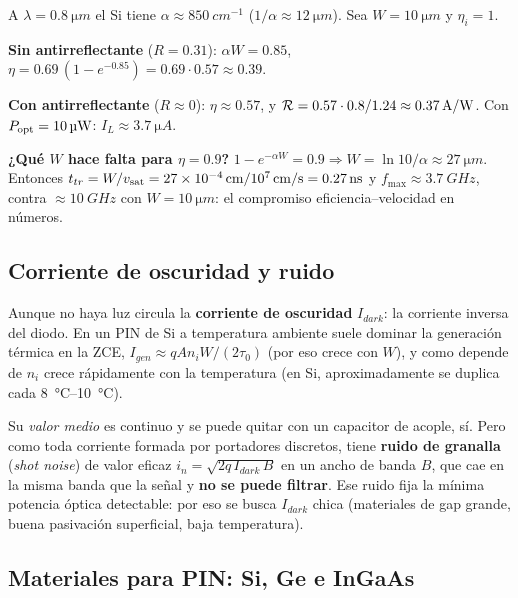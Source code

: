 \begin{ejemplo}
A $\lambda=\SI{0.8}{\micro m}$ el Si tiene $\alpha\approx\SI{850}{cm^{-1}}$
($1/\alpha\approx\SI{12}{\micro m}$). Sea $W=\SI{10}{\micro m}$ y $\eta_i=1$.

\textbf{Sin antirreflectante} ($R=0.31$): $\alpha W=0.85$,
$\eta=0.69\,(1-e^{-0.85})=0.69\cdot0.57\approx0.39$.

\textbf{Con antirreflectante} ($R\approx0$): $\eta\approx0.57$, y
$\mathcal{R}=0.57\cdot0.8/1.24\approx\SI{0.37}{A/W}$. Con $P_{\mathrm{opt}}=\SI{10}{\micro W}$:
$I_L\approx\SI{3.7}{\micro A}$.

\textbf{¿Qué $W$ hace falta para $\eta=0.9$?} $1-e^{-\alpha W}=0.9\Rightarrow
W=\ln10/\alpha\approx\SI{27}{\micro m}$. Entonces
$t_{tr}=W/v_{\mathrm{sat}}=\SI{27e-4}{cm}/\SI{e7}{cm/s}=\SI{0.27}{ns}$ y
$f_{\max}\approx\SI{3.7}{GHz}$, contra $\approx\SI{10}{GHz}$ con $W=\SI{10}{\micro m}$:
el compromiso eficiencia--velocidad en números.
\end{ejemplo}

\subsection{Corriente de oscuridad y ruido}

Aunque no haya luz circula la \textbf{corriente de oscuridad} $I_{dark}$: la corriente
inversa del diodo. En un PIN de Si a temperatura ambiente suele dominar la generación
térmica en la ZCE, $I_{gen}\approx qAn_iW/(2\tau_0)$ (por eso crece con $W$), y como
depende de $n_i$ crece rápidamente con la temperatura (en Si, aproximadamente se duplica cada
\SIrange{8}{10}{\celsius}).

\begin{ojo}
Su \emph{valor medio} es continuo y se puede quitar con un capacitor de acople, sí. Pero
como toda corriente formada por portadores discretos, tiene \textbf{ruido de granalla}
(\emph{shot noise}) de valor eficaz $i_n=\sqrt{2q\,I_{dark}\,B}$ en un ancho de banda $B$,
que cae en la misma banda que la señal y \textbf{no se puede filtrar}. Ese ruido fija la
mínima potencia óptica detectable: por eso se busca $I_{dark}$ chica (materiales de gap
grande, buena pasivación superficial, baja temperatura).
\end{ojo}

\subsection{Materiales para PIN: Si, Ge e InGaAs}
\label{sec:materiales-pin}

